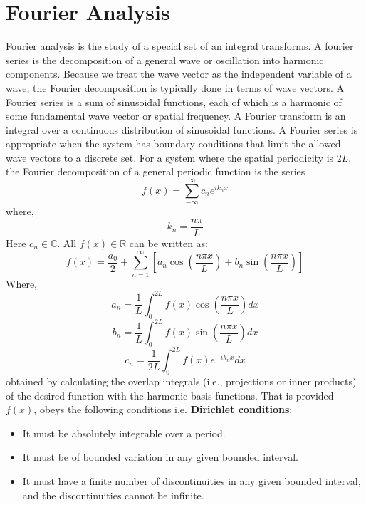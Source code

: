 \section{Fourier Analysis}
Fourier analysis is the study of a special set of an integral transforms. 
A fourier series is the decomposition of a general wave or oscillation into harmonic components.
Because we treat the wave vector as the independent variable of a wave, the Fourier decomposition
is typically done in terms of wave vectors. A Fourier series is a sum of sinusoidal functions, each of
which is a harmonic of some fundamental wave vector or spatial frequency. A Fourier transform is an
integral over a continuous distribution of sinusoidal functions.
A Fourier series is appropriate when the system has boundary conditions that limit the allowed
wave vectors to a discrete set. For a system where the spatial periodicity is $2L$, the Fourier decomposition of a general periodic function is the series
\begin{equation}
f(x) = \sum_{-\infty}^{\infty} c_{n}e^{i k_{n}x}
\end{equation}
where,
$$k_{n} = \frac{n \pi}{L}$$
Here $c_{n} \in \mathbb{C}$. All $f(x) \in \mathbb{R}$ can be written as:
\begin{equation}
f(x) = \frac{a_{0}}{2} + \sum^{\infty}_{n=1} \left[a_{n}\cos \left(\frac{n \pi x}{L} \right) + b_{n}\sin \left(\frac{n \pi x}{L}\right) \right]
\end{equation}
Where,
\begin{equation}
	a_{n} = \frac{1}{L} \int_{0}^{2L} f(x) \cos\left(\frac{n \pi x}{L}\right) dx
\end{equation}
\begin{equation}
	b_{n} = \frac{1}{L} \int_{0}^{2L} f(x) \sin\left(\frac{n \pi x}{L}\right) dx
\end{equation}
\begin{equation}
	c_{n} = \frac{1}{2L} \int_{0}^{2L} f(x) e^{-ik_{n}x}dx
\end{equation}
obtained by calculating the overlap integrals (i.e., projections or inner products) of the desired function with the harmonic basis functions. That is provided $f(x)$, obeys the following conditions i.e. \textbf{Dirichlet conditions}:
\begin{itemize}
\item It must be absolutely integrable over a period.
\item It must be of bounded variation in any given bounded interval.
\item It must have a finite number of discontinuities in any given bounded interval, and the discontinuities cannot be infinite.
\end{itemize}
